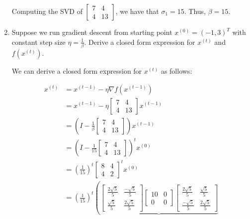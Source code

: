 \documentclass[11pt]{article}
\theoremstyle{definition}
\theoremstyle{case}
\theoremstyle{theorem}
\begin{document}
\begin{enumerate}[label=(\alph*)]
Computing the SVD of $\left[ \begin{matrix} 7 & 4 \\ 4 & 13 \end{matrix}\right]$, we have that $\sigma_1 = 15$. Thus, $\beta = 15$. 

\item Suppose we run gradient descent from starting point $x^{(0)} = (-1, 3)^T$ with constant step size $\eta = \frac{1}{\beta}$.
Derive a closed form expression for $x^{(t)}$ and $f(x^{(t)})$. 

We can derive a closed form expression for $x^{(t)}$ as follows:

\begin{align*}
  x^{(t)} &= x^{(t-1)} - \eta \nabla f(x^{(t-1)}) \\
          &= x^{(t-1)} - \eta \left[ \begin{matrix} 7 & 4 \\ 4 & 13 \end{matrix}\right] x^{(t-1)} \\
          &= \left(I - \frac{1}{\beta} \left[ \begin{matrix} 7 & 4 \\ 4 & 13 \end{matrix}\right] \right) x^{(t-1)} \\
          &= \left(I - \frac{1}{15} \left[ \begin{matrix} 7 & 4 \\ 4 & 13 \end{matrix}\right] \right)^t x^{(0)} \\
          &= \left(\frac{1}{15}\right)^t \left[ \begin{matrix} 8 & 4 \\ 4 & 2 \end{matrix}\right]^t x^{(0)} \\
          &= \left(\frac{1}{15}\right)^t 
             \left( 
               \underbrace{
                \left[ \begin{matrix} \frac{2 \sqrt{5}}{5} & \frac{-\sqrt{5}}{5} \\ \frac{\sqrt{5}}{5} & \frac{2\sqrt{5}}{5} \end{matrix}\right] 
                \left[ \begin{matrix} 10 & 0 \\ 0 & 0 \end{matrix}\right]
                \left[ \begin{matrix} \frac{2 \sqrt{5}}{5} & \frac{\sqrt{5}}{5} \\ \frac{-\sqrt{5}}{5} & \frac{2\sqrt{5}}{5} \end{matrix}\right] 
}
\end{align*}
\end{enumerate}
\end{document}
